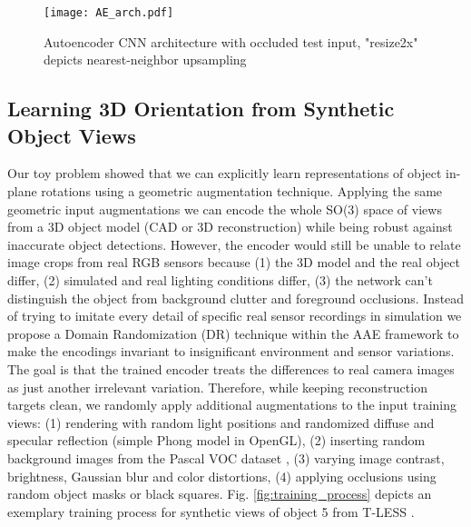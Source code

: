 \begin{figure}[t]%
	\centering
	\captionsetup{width=\textwidth}
	\texttt{[image: AE\_arch.pdf]}
	\caption{Autoencoder CNN architecture with occluded test input, "resize2x" depicts nearest-neighbor upsampling}
	\label{fig:ae_arch}
\end{figure}
\subsection{Learning 3D Orientation from Synthetic Object Views}
Our toy problem showed that we can explicitly learn representations of object in-plane rotations using a geometric augmentation technique. Applying the same geometric input augmentations we can encode the whole SO(3) space of views from a 3D object model (CAD or 3D reconstruction) while being robust against inaccurate object detections. However, the encoder would still be unable to relate image crops from real RGB sensors because 
(1) the 3D model and the real object differ, (2) simulated and real lighting conditions differ, (3) the network can't distinguish the object from background clutter and foreground occlusions. 
Instead of trying to imitate every detail of specific real sensor recordings in simulation we propose a Domain Randomization (DR) technique within the \gls{AAE} framework to make the encodings invariant to insignificant environment and sensor variations. The goal is that the trained encoder treats the differences to real camera images as just another irrelevant variation. Therefore, while keeping reconstruction targets clean, we randomly apply additional augmentations to the input training views: (1) rendering with random light positions and randomized diffuse and specular reflection (simple Phong model \citep{phong1975illumination} in OpenGL), (2) inserting random background images from the Pascal VOC dataset \citep{pascalvoc2012}, (3) varying image contrast, brightness, Gaussian blur and color distortions, (4) applying occlusions using random object masks or black squares. Fig. \ref{fig:training_process} depicts an exemplary training process for synthetic views of object 5 from T-LESS \citep{hodan2017tless}.

